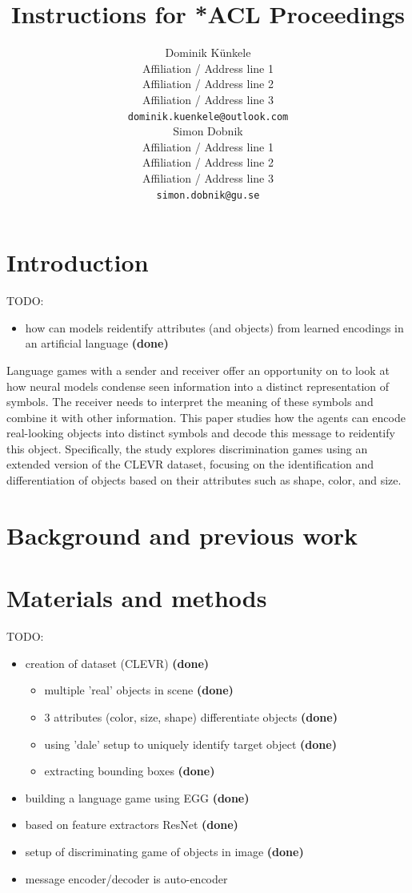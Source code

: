 \documentclass[11pt]{article}
\title{Instructions for *ACL Proceedings}
\author{Dominik Künkele \\
  Affiliation / Address line 1 \\
  Affiliation / Address line 2 \\
  Affiliation / Address line 3 \\
  \texttt{dominik.kuenkele@outlook.com} \\\And
  Simon Dobnik \\
  Affiliation / Address line 1 \\
  Affiliation / Address line 2 \\
  Affiliation / Address line 3 \\
  \texttt{simon.dobnik@gu.se} \\}
\begin{document}
\maketitle
\begin{abstract}

\end{abstract}

\section{Introduction}
TODO:
\begin{itemize}
  \item how can models reidentify attributes (and objects) from learned encodings in an artificial language \textbf{(done)}
\end{itemize}
Language games with a sender and receiver offer an opportunity on to look at how neural models condense seen information into a distinct representation of symbols. The receiver needs to interpret the meaning of these symbols and combine it with other information. This paper studies how the agents can encode real-looking objects into distinct symbols and decode this message to reidentify this object. Specifically, the study explores discrimination games using an extended version of the CLEVR dataset, focusing on the identification and differentiation of objects based on their attributes such as shape, color, and size.

\section{Background and previous work}

\section{Materials and methods}
TODO:
\begin{itemize}
  \item creation of dataset (CLEVR) \textbf{(done)}
        \begin{itemize}
          \item multiple 'real' objects in scene \textbf{(done)}
          \item 3 attributes (color, size, shape) differentiate objects \textbf{(done)}
          \item using 'dale' setup to uniquely identify target object \textbf{(done)}
          \item extracting bounding boxes \textbf{(done)}
        \end{itemize}
  \item building a language game using EGG \textbf{(done)}
  \item based on feature extractors ResNet \textbf{(done)}
  \item setup of discriminating game of objects in image \textbf{(done)}
  \item message encoder/decoder is auto-encoder
\end{itemize}
\end{document}
